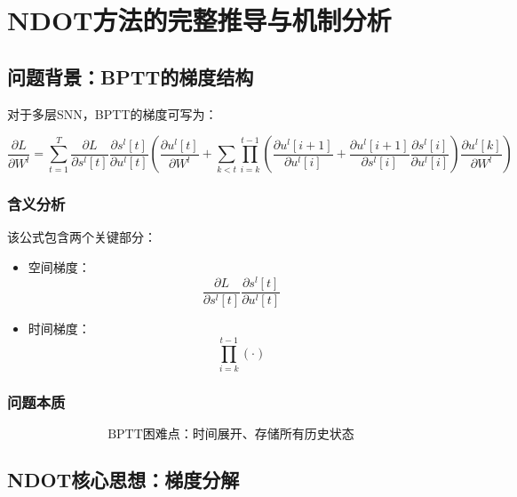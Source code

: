 \documentclass[journal,12pt,onecolumn]{IEEEtran}
\begin{document}
\section{NDOT方法的完整推导与机制分析}

\subsection{问题背景：BPTT的梯度结构}

对于多层SNN，BPTT的梯度可写为：

\begin{equation}
\frac{\partial L}{\partial W^l}
=
\sum_{t=1}^{T}
\frac{\partial L}{\partial s^l[t]}
\frac{\partial s^l[t]}{\partial u^l[t]}
\left(
\frac{\partial u^l[t]}{\partial W^l}
+
\sum_{k<t}
\prod_{i=k}^{t-1}
\left(
\frac{\partial u^l[i+1]}{\partial u^l[i]}
+
\frac{\partial u^l[i+1]}{\partial s^l[i]}
\frac{\partial s^l[i]}{\partial u^l[i]}
\right)
\frac{\partial u^l[k]}{\partial W^l}
\right)
\end{equation}



\subsubsection{含义分析}

该公式包含两个关键部分：

\begin{itemize}
\item 空间梯度：
\[
\frac{\partial L}{\partial s^l[t]}
\frac{\partial s^l[t]}{\partial u^l[t]}
\]

\item 时间梯度：
\[
\prod_{i=k}^{t-1} (\cdot)
\]
\end{itemize}



\subsubsection{问题本质}

\begin{equation}
\text{BPTT困难点：}  \text{时间展开、}  \text{存储所有历史状态}
\end{equation}



\subsection{NDOT核心思想：梯度分解}
\end{document}
